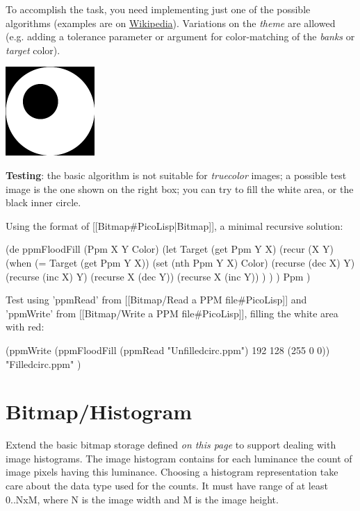 To accomplish the task, you need implementing just one of the possible
algorithms (examples are on
\href{http://en.wikipedia.org/wiki/flood\_fill}{Wikipedia}). Variations
on the \emph{theme} are allowed (e.g. adding a tolerance parameter or
argument for color-matching of the \emph{banks} or \emph{target} color).

{\includegraphics{graphics/128px-Unfilledcirc.png}}

\textbf{Testing}: the basic algorithm is not suitable for
\emph{truecolor} images; a possible test image is the one shown on the
right box; you can try to fill the white area, or the black inner
circle.

\begin{wideverbatim}

Using the format of [[Bitmap#PicoLisp|Bitmap]], a minimal recursive solution:

(de ppmFloodFill (Ppm X Y Color)
   (let Target (get Ppm Y X)
      (recur (X Y)
         (when (= Target (get Ppm Y X))
            (set (nth Ppm Y X) Color)
            (recurse (dec X) Y)
            (recurse (inc X) Y)
            (recurse X (dec Y))
            (recurse X (inc Y)) ) ) )
   Ppm )

Test using 'ppmRead' from [[Bitmap/Read a PPM file#PicoLisp]] and
'ppmWrite' from [[Bitmap/Write a PPM file#PicoLisp]], 
filling the white area with red:

(ppmWrite
   (ppmFloodFill (ppmRead "Unfilledcirc.ppm") 192 128 (255 0 0))
   "Filledcirc.ppm" )

\end{wideverbatim}

\pagebreak{}
\section*{Bitmap/Histogram}


Extend the basic bitmap storage defined \emph{on this page} to support
dealing with image histograms. The image histogram contains for each
luminance the count of image pixels having this luminance. Choosing a
histogram representation take care about the data type used for the
counts. It must have range of at least 0..NxM, where N is the image
width and M is the image height.

